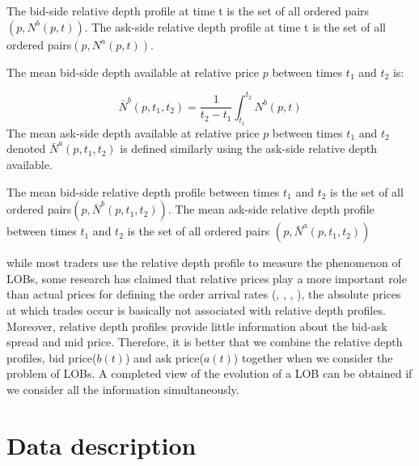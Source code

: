 \begin{defn}\cite{gould2013limit}
The bid-side relative depth profile at time t is the set of all ordered pairs$(p, N^b(p, t)).$ The ask-side relative depth profile at time t is the set of all ordered pairs$(p, N^a(p, t))$.
\end{defn}

\begin{defn}\cite{gould2013limit}
The mean bid-side depth available at relative price $p$ between times $t_1$ and $t_2$ is: 

\begin{equation*}
\bar{N}^b(p, t_1, t_2)=\frac{1}{t_2-t_1}\int_{t_1}^{t_2}N^b(p, t)
\end{equation*}
The mean ask-side depth available at relative price $p$ between times $t_1$ and $t_2$ denoted $\bar{N}^a(p, t_1, t_2)$ is defined similarly using the ask-side relative depth available.
\end{defn}

\begin{defn}\cite{gould2013limit}
The mean bid-side relative depth profile between times $t_1$ and $t_2$ is the set of all ordered pairs$(p, \bar{N}^b(p, t_1, t_2))$. The mean ask-side relative depth profile between times $t_1$ and $t_2$ is the set of all ordered pairs $(p, \bar{N}^a(p, t_1, t_2))$ 
\end{defn}

while most traders use the relative depth profile to measure the phenomenon of LOBs,  some research has claimed that relative prices play a more important role than actual prices for defining the order arrival rates (\cite{biais1995empirical}, \cite{bouchaud2002statistical}, \cite{potters2003more}, \cite{zovko2002power}), the absolute prices at which trades occur  is basically not associated with relative depth profiles. Moreover,  relative depth profiles provide little information about the bid-ask spread and mid price. Therefore,  it is better that we combine the relative depth profiles,  bid price($b(t)$) and ask price($a(t)$) together when we consider the problem of LOBs. A completed view of the evolution of a LOB can be obtained if we consider all the information simultaneously.


\section{Data description}

